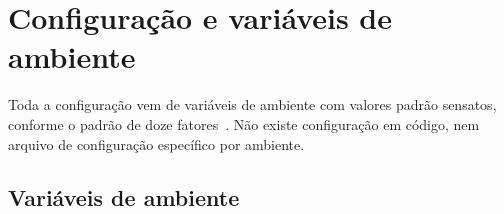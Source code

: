 \chapter{Configuração e variáveis de ambiente}
\label{ap:config}

Toda a configuração vem de variáveis de ambiente com valores padrão sensatos,
conforme o padrão de doze fatores~\cite{wiggins2017twelvefactor}. Não existe
configuração em código, nem arquivo de configuração específico por ambiente.

\section{Variáveis de ambiente}

